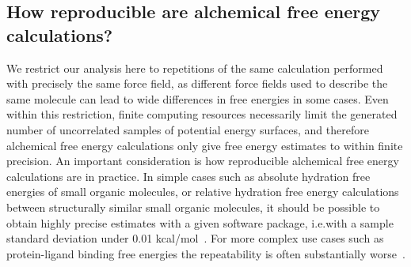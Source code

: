 \documentclass[9pt,bestpractices]{livecoms}
\begin{document}
\subsection{How reproducible are alchemical free energy calculations?}
\label{subsec:reproducible}
We restrict our analysis here to repetitions of the same calculation performed with precisely the same force field, as different force fields used to describe the same molecule can lead to wide differences in free energies in some cases.  Even within this restriction,
finite computing resources necessarily limit the generated number of uncorrelated samples of potential energy surfaces, and therefore alchemical free energy calculations only give free energy estimates to within finite precision. An important consideration is how reproducible alchemical free energy calculations are in practice. In simple cases such as absolute hydration free energies of small organic molecules, or relative hydration free energy calculations between structurally similar small organic molecules, it should be possible to obtain highly precise estimates with a given software package, i.e.with a sample standard deviation under 0.01 kcal/mol~\cite{rizzi2019sampl6}.
For more complex use cases such as protein-ligand binding free energies the repeatability is often substantially worse~\cite{rizzi2019sampl6}. 
\end{document}
